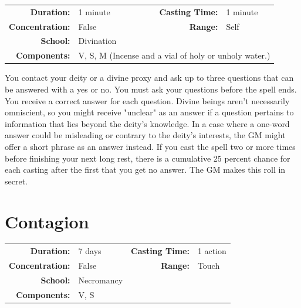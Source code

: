 \documentclass[12pt,showtrims]{memoir}
\begin{document}
{
\small\centering\vspace{-6pt}
\begin{tabular}{rlrl}
\toprule

\textbf{Duration:} & 1 minute &
\textbf{Casting Time:} & 1 minute \\
\textbf{Concentration:} & False &
\textbf{Range:} & Self \\
\textbf{School:} & Divination \\
\textbf{Components:} & \multicolumn{3}{p{0.7\textwidth}}{V, S, M (Incense and a vial of holy or unholy water.)}\\

\bottomrule
\end{tabular}
}

\vspace{1\baselineskip}\noindent You contact your deity or a divine proxy and ask up to three questions that can be answered with a yes or no. You must ask your questions before the spell ends. You receive a correct answer for each question. Divine beings aren't necessarily omniscient, so you might receive "unclear" as an answer if a question pertains to information that lies beyond the deity's knowledge. In a case where a one-word answer could be misleading or contrary to the deity's interests, the GM might offer a short phrase as an answer instead. If you cast the spell two or more times before finishing your next long rest, there is a cumulative 25 percent chance for each casting after the first that you get no answer. The GM makes this roll in secret.

\newpage
\section*{Contagion}

{
\small\centering\vspace{-6pt}
\begin{tabular}{rlrl}
\toprule

\textbf{Duration:} & 7 days &
\textbf{Casting Time:} & 1 action \\
\textbf{Concentration:} & False &
\textbf{Range:} & Touch \\
\textbf{School:} & Necromancy \\
\textbf{Components:} & \multicolumn{3}{p{0.7\textwidth}}{V, S}\\

\bottomrule
\end{tabular}
}
\end{document}
